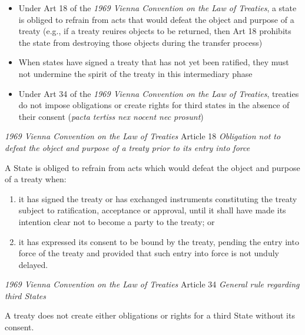 \begin{itemize}
    \item Under Art 18 of the \textit{1969 Vienna Convention on the Law of Treaties}, a state is obliged to refrain from acts that would defeat the object and purpose of a treaty (e.g., if a treaty reuires objects to be returned, then Art 18 prohibits the state from destroying those objects during the transfer process)
    \item When states have signed a treaty that has not yet been ratified, they must not undermine the spirit of the treaty in this intermediary phase
    \item Under Art 34 of the \textit{1969 Vienna Convention on the Law of Treaties}, treaties do not impose obligations or create rights for third states in the absence of their consent (\textit{pacta tertiss nex nocent nec prosunt})
\end{itemize}

\begin{conventiondetails}{\textit{1969 Vienna Convention on the Law of Treaties} Article 18}\label{VCLT Art 18}
    \flushleft
    \textit{Obligation not to defeat the object and purpose of a treaty prior to its entry into force}

    \vspace{\baselineskip}

    A State is obliged to refrain from acts which would defeat the object and purpose of a treaty when:

    \begin{enumerate}[label=(\alph*)]
        \item it has signed the treaty or has exchanged instruments constituting the treaty subject to ratification, acceptance or approval, until it shall have made its intention clear not to become a party to the treaty; or 
        \item it has expressed its consent to be bound by the treaty, pending the entry into force of the treaty and provided that such entry into force is not unduly delayed.
    \end{enumerate}
\end{conventiondetails}

\begin{conventiondetails}{\textit{1969 Vienna Convention on the Law of Treaties} Article 34}\label{VCLT Art 34}
    \flushleft
    \textit{General rule regarding third States}

    \vspace{\baselineskip}

    A treaty does not create either obligations or rights for a third State without its consent.
\end{conventiondetails}

